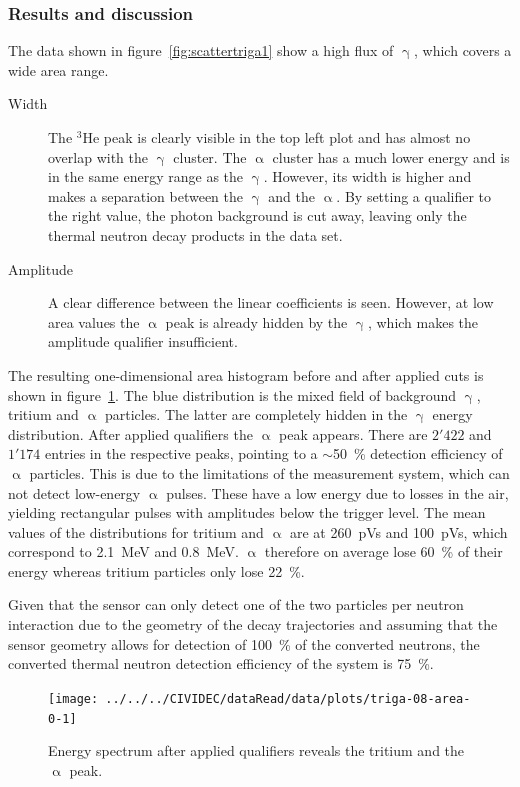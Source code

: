 \subsubsection{Results and discussion}
The data shown in figure~\ref{fig:scattertriga1} show a high flux of $\upgamma$, which covers a wide area range. 
\begin{description}
\item[Width] The $^3$He peak is clearly visible in the top left plot and has almost no overlap with the $\upgamma$ cluster. The $\upalpha$ cluster has a much lower energy and is in the same energy range as the $\upgamma$. However, its width is higher and makes a separation between the $\upgamma$ and the $\upalpha$. By setting a qualifier to the right value, the photon background is cut away, leaving only the thermal neutron decay products in the data set. 
\item[Amplitude] A clear difference between the linear coefficients is seen. However, at low area values the $\upalpha$ peak is already hidden by the $\upgamma$, which makes the amplitude qualifier insufficient.
\end{description}
The resulting one-dimensional area histogram before and after applied cuts is shown in figure~\ref{fig:areatriga0}. The blue distribution is the mixed field of background $\upgamma$, tritium and $\upalpha$ particles. The latter are completely hidden in the $\upgamma$ energy distribution. After applied qualifiers the $\upalpha$ peak appears. There are $2'422$ and $1'174$ entries in the respective peaks, pointing to a $\sim$50~\% detection efficiency of $\upalpha$ particles. This is due to the limitations of the measurement system, which can not detect low-energy $\upalpha$ pulses. These have a low energy due to losses in the air, yielding rectangular pulses with amplitudes below the trigger level. The mean values of the distributions for tritium and $\upalpha$ are at 260~pVs and 100~pVs, which correspond to 2.1~MeV and 0.8~MeV. $\upalpha$ therefore on average lose 60~\% of their energy whereas tritium particles only lose 22~\%.

Given that the sensor can only detect one of the two particles per neutron interaction due to the geometry of the decay trajectories and assuming that the sensor geometry allows for detection of 100~\% of the converted neutrons, the converted thermal neutron detection efficiency of the system is 75~\%.

\clearpage
\begin{figure}[!t]
\centering
\texttt{[image: ../../../CIVIDEC/dataRead/data/plots/triga-08-area-0-1]}
\caption{Energy spectrum after applied qualifiers reveals the tritium and the $\upalpha$ peak.}
\label{fig:areatriga0}
\end{figure}

